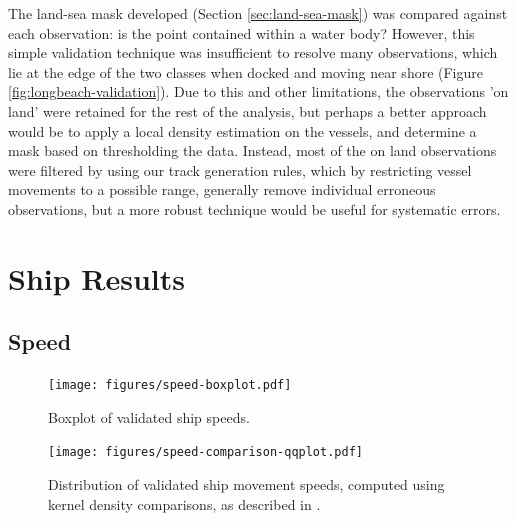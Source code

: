 The land-sea mask developed (Section \ref{sec:land-sea-mask}) was compared against each observation: is the point contained within a water body? However, this simple validation technique was insufficient to resolve many observations, which lie at the edge of the two classes when docked %
 and moving near shore %
(Figure \ref{fig:longbeach-validation}). Due to this and other limitations, the observations 'on land' were retained for the rest of the analysis, but perhaps a better approach would be to apply a local density estimation on the vessels, and determine a mask based on thresholding the data. Instead, most of the on land observations were filtered by using our track generation rules, which by restricting vessel movements to a possible range, generally remove individual erroneous observations, but a more robust technique would be useful for systematic errors.


\section{Ship Results}

\subsection{Speed}
\begin{figure}
  \centering
  \texttt{[image: figures/speed-boxplot.pdf]}
  \caption[Validated ship speeds by class]{Boxplot of validated ship speeds.}
  \label{fig:vessel-speed-boxplot} %
\end{figure}

\begin{figure}[t]
  \centering
  \texttt{[image: figures/speed-comparison-qqplot.pdf]}
  \caption[Validated ship speeds by class, kernel density estimation]{Distribution of validated ship movement speeds, computed using kernel density comparisons, as described in \citep{bowman1997applied}.}
  \label{fig:vessel-speed-density}
\end{figure}

